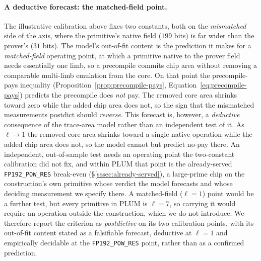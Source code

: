 \paragraph{A deductive forecast: the matched-field point.}
The illustrative calibration above fixes two constants, both on the \emph{mismatched} side of the axis, where the primitive's native field ($199$ bits) is far wider than the prover's ($31$ bits). The model's out-of-fit content is the prediction it makes for a \emph{matched-field} operating point, at which a primitive native to the prover field needs essentially one limb, so a precompile commits chip area without removing a comparable multi-limb emulation from the core. On that point the precompile-pays inequality (Proposition~\ref{prop:precompile-pays}, Equation~\eqref{eq:precompile-pays}) predicts the precompile does \emph{not} pay. The removed core area shrinks toward zero while the added chip area does not, so the sign that the mismatched measurements postdict should \emph{reverse}. This forecast is, however, a \emph{deductive} consequence of the trace-area model rather than an independent test of it. As $\ell\to1$ the removed core area shrinks toward a single native operation while the added chip area does not, so the model cannot but predict no-pay there. An independent, out-of-sample test needs an operating point the two-constant calibration did not fix, and within PLUM that point is the already-served \texttt{FP192\_POW\_RES} break-even (\S\ref{sssec:already-served}), a large-prime chip on the construction's own primitive whose verdict the model forecasts and whose deciding measurement we specify there. A matched-field ($\ell=1$) point would be a further test, but every primitive in PLUM is $\ell=7$, so carrying it would require an operation outside the construction, which we do not introduce. We therefore report the criterion as \emph{postdictive} on its two calibration points, with its out-of-fit content stated as a falsifiable forecast, deductive at $\ell=1$ and empirically decidable at the \texttt{FP192\_POW\_RES} point, rather than as a confirmed prediction.

